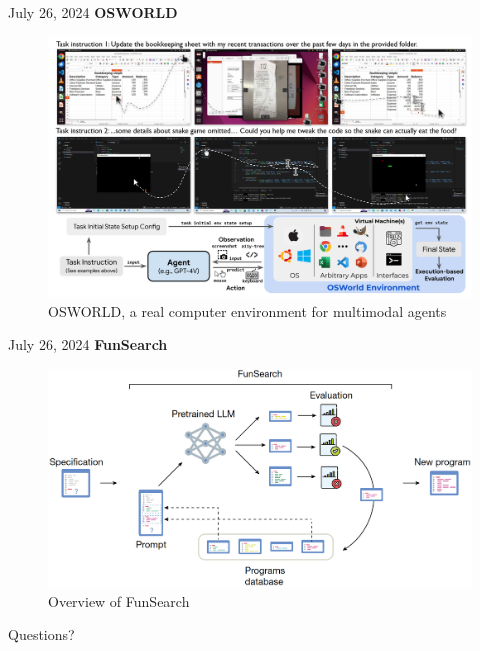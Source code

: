 \documentclass[10pt]{beamer}
\begin{document}
\begin{frame}{July 26, 2024}
    \textbf{OSWORLD}
    \begin{figure}
        \centering
        \includegraphics[width=\textwidth]{Fig/2024.7.26_2.png}
        \caption{OSWORLD, a real computer environment for multimodal agents}
        \label{fig:my_label}
    \end{figure}
\end{frame}

\begin{frame}{July 26, 2024}
    \textbf{FunSearch}
    \begin{figure}
        \centering
        \includegraphics[width=\textwidth]{Fig/2024.7.26_1.png}
        \caption{Overview of FunSearch}
        \label{fig:my_label}
    \end{figure}
\end{frame}


\begin{frame}[standout]
  Questions?
\end{frame}
\end{document}
